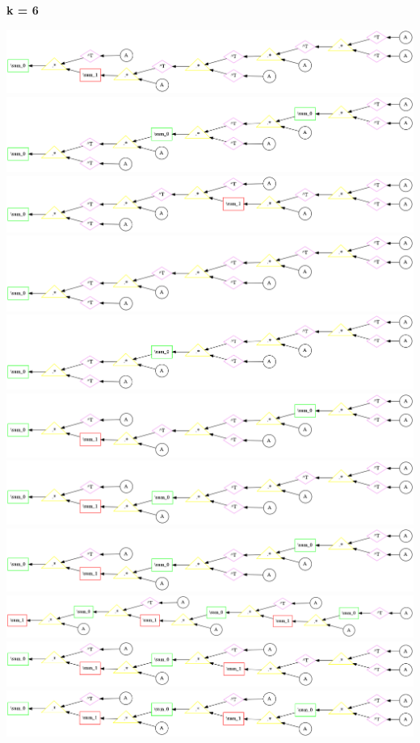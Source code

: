{\bf k = 6}


\begin{center}
\includegraphics[width=0.45\linewidth]{trees/Sym_6_horizontal_0.png}
\includegraphics[width=0.45\linewidth]{trees/Sym_6_horizontal_1.png}
\includegraphics[width=0.45\linewidth]{trees/Sym_6_horizontal_2.png}
\includegraphics[width=0.45\linewidth]{trees/Sym_6_horizontal_3.png}
\includegraphics[width=0.45\linewidth]{trees/Sym_6_horizontal_4.png}
\includegraphics[width=0.45\linewidth]{trees/Sym_6_horizontal_5.png}
\includegraphics[width=0.45\linewidth]{trees/Sym_6_horizontal_6.png}
\includegraphics[width=0.45\linewidth]{trees/Sym_6_horizontal_7.png}
\includegraphics[width=0.45\linewidth]{trees/Sym_6_horizontal_8.png}
\includegraphics[width=0.45\linewidth]{trees/Sym_6_horizontal_9.png}
\includegraphics[width=0.45\linewidth]{trees/Sym_6_horizontal_10.png}
\end{center}


